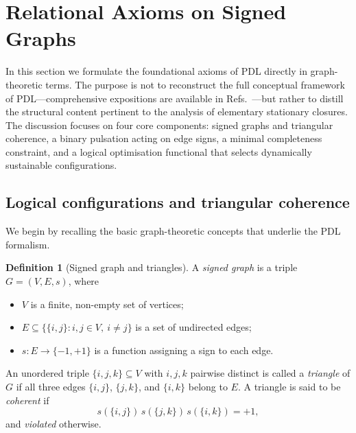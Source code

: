 \documentclass[11pt,a4paper]{article}
\theoremstyle{definition}
\newtheorem{definition}[theorem]{Definition}
\begin{document}
\section{Relational Axioms on Signed Graphs}
\label{sec:axioms_graphs}

In this section we formulate the foundational axioms of PDL directly in graph-theoretic terms. The purpose is not to reconstruct the full conceptual framework of PDL—comprehensive expositions are available in Refs.~\cite{PDL_Intro_2026,PDL_Main_2026,PDL_French_2026}—but rather to distill the structural content pertinent to the analysis of elementary stationary closures. The discussion focuses on four core components: signed graphs and triangular coherence, a binary pulsation acting on edge signs, a minimal completeness constraint, and a logical optimisation functional that selects dynamically sustainable configurations.\cite{PDL_Intro_2026,PDL_Main_2026,PDL_TO_Dialogue_2026}

\subsection{Logical configurations and triangular coherence}

We begin by recalling the basic graph-theoretic concepts that underlie the PDL formalism.\cite{PDL_Main_2026,Harary1953,CartwrightHarary1956}

\begin{definition}[Signed graph and triangles]
\label{def:signed_graph}
A \emph{signed graph} is a triple $G = (V,E,s)$, where
\begin{itemize}
  \item $V$ is a finite, non-empty set of vertices;
  \item $E \subseteq \{\{i,j\} : i,j \in V,\ i \neq j\}$ is a set of undirected edges;
  \item $s : E \to \{-1,+1\}$ is a function assigning a sign to each edge.
\end{itemize}
An unordered triple $\{i,j,k\} \subseteq V$ with $i,j,k$ pairwise distinct is called a \emph{triangle} of $G$ if all three edges $\{i,j\}$, $\{j,k\}$, and $\{i,k\}$ belong to $E$. A triangle is said to be \emph{coherent} if
\[
 s(\{i,j\})\,s(\{j,k\})\,s(\{i,k\}) = +1,
\]
and \emph{violated} otherwise.
\end{definition}
\end{document}
